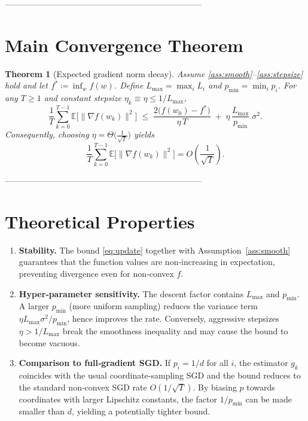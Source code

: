 \documentclass{article}
\newtheorem{theorem}{Theorem}
\newcommand{\E}{\mathbb{E}}
\begin{document}
-----------------------------------------------------------------------

\section*{Main Convergence Theorem}
\begin{theorem}[Expected gradient norm decay]\label{thm:main}
Assume \ref{ass:smooth}–\ref{ass:stepsize} hold and let $f^{*}\coloneqq\inf_{w}f(w)$.
Define $L_{\max}=\max_i L_i$ and $p_{\min}=\min_i p_i$.
For any $T\ge1$ and constant stepsize $\eta_k\equiv\eta\le1/L_{\max}$,
\[
\frac{1}{T}\sum_{k=0}^{T-1}\E\!\bigl[\|\nabla f(w_k)\|^{2}\bigr]
\;\le\;
\frac{2\bigl(f(w_0)-f^{*}\bigr)}{\eta\,T}
\;+\;
\eta\,\frac{L_{\max}}{p_{\min}}\;\sigma^{2}.
\tag{4}
\]
Consequently, choosing $\eta=\Theta\!\bigl(\frac{1}{\sqrt{T}}\bigr)$ yields
\[
\frac{1}{T}\sum_{k=0}^{T-1}\E\!\bigl[\|\nabla f(w_k)\|^{2}\bigr]
=O\!\left(\frac{1}{\sqrt{T}}\right).
\]
\end{theorem}

-----------------------------------------------------------------------

\section*{Theoretical Properties}
\begin{enumerate}[label=\arabic*.]
\item \textbf{Stability.}
The bound \eqref{eq:update} together with Assumption~\ref{ass:smooth}
guarantees that the function values are non‑increasing in expectation,
preventing divergence even for non‑convex $f$.

\item \textbf{Hyper‑parameter sensitivity.}
The descent factor contains $L_{\max}$ and $p_{\min}$.
A larger $p_{\min}$ (more uniform sampling) reduces the variance term
$\eta L_{\max}\sigma^{2}/p_{\min}$, hence improves the rate.
Conversely, aggressive stepsizes $\eta>1/L_{\max}$ break the smoothness
inequality and may cause the bound to become vacuous.

\item \textbf{Comparison to full‑gradient SGD.}
If $p_i=1/d$ for all $i$, the estimator $g_k$ coincides with the usual
coordinate‑sampling SGD and the bound reduces to the standard
non‑convex SGD rate $O(1/\sqrt{T})$.  By biasing $p$ towards coordinates
with larger Lipschitz constants, the factor $1/p_{\min}$ can be made
smaller than $d$, yielding a potentially tighter bound.
\end{enumerate}
\end{document}
